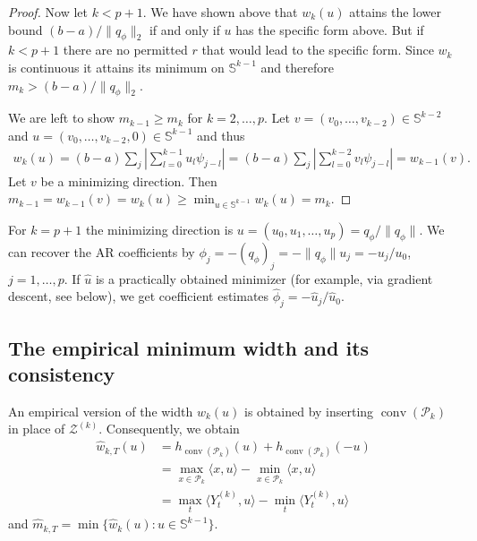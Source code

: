 \begin{proof}
    Now let $k<p+1$. We have shown above that $w_k(u)$ attains the lower bound $(b-a)/\|q_{\phi}\|_2$ if and only if $u$ has the specific form above. But if $k<p+1$ there are no permitted $r$ that would lead to the specific form. Since $w_k$ is continuous it attains its minimum on $\mathbb{S}^{k-1}$ and therefore $m_k>(b-a)/\|q_{\phi}\|_2$.

    We are left to show $m_{k-1}\ge m_k$ for $k=2,\dots,p$. Let $v=(v_0,\dots,v_{k-2})\in\mathbb{S}^{k-2}$ and $u=(v_0,\dots,v_{k-2},0)\in\mathbb{S}^{k-1}$ and thus
    \begin{align*}
        w_{k}(u)=(b-a)\sum_{j}\left|\sum_{l=0}^{k-1}u_l\psi_{j-l}\right|=(b-a)\sum_{j}\left|\sum_{l=0}^{k-2}v_l\psi_{j-l}\right|=w_{k-1}(v).
    \end{align*}
    Let $v$ be a minimizing direction. Then $m_{k-1}=w_{k-1}(v)=w_k(u)\ge\min_{u\in\mathbb{S}^{k-1}}w_k(u)=m_k$.
\end{proof}

\begin{Rem}\label{rem:minimizer_estimates_coefficients}
    For $k=p+1$ the minimizing direction is $u=(u_0,u_1,\dots,u_p)=q_{\phi}/\|q_{\phi}\|$. We can recover the AR coefficients by $\phi_j=-(q_{\phi})_j=-\|q_{\phi}\|u_j=-u_j/u_0$, $j=1,\dots,p$. If $\hat{u}$ is a practically obtained minimizer (for example, via gradient descent, see below), we get coefficient estimates $\hat{\phi}_j=-\hat{u}_j/\hat{u}_0$.
\end{Rem}

\subsection{The empirical minimum width and its consistency}\label{sec:emp_min_width}

An empirical version of the width $w_k(u)$ is obtained by inserting $\operatorname{conv}(\mathcal{P}_k)$ in place of $\mathcal{Z}^{(k)}$. Consequently, we obtain
\begin{align*}
    \hat{w}_{k,T}(u)&=h_{\operatorname{conv}(\mathcal{P}_k)}(u)+h_{\operatorname{conv}(\mathcal{P}_k)}(-u)\\&
    =\max_{x\in\mathcal{P}_k}\langle x,u\rangle-\min_{x\in\mathcal{P}_k}\langle x,u\rangle\\&
    =\max_t\langle Y_t^{(k)},u\rangle-\min_t\langle Y_t^{(k)},u\rangle
\end{align*}
and $\hat{m}_{k,T}=\min\{\hat{w}_k(u):u\in\mathbb{S}^{k-1}\}$.

